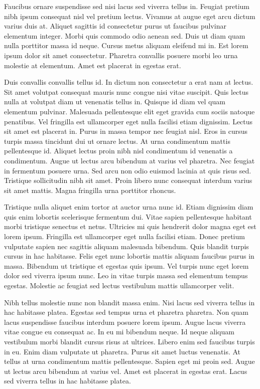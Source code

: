 \documentclass[11pt,a4paper]{article}
\begin{document}
Faucibus ornare suspendisse sed nisi lacus sed viverra tellus in. Feugiat pretium nibh ipsum consequat nisl vel pretium lectus. Vivamus at augue eget arcu dictum varius duis at. Aliquet sagittis id consectetur purus ut faucibus pulvinar elementum integer. Morbi quis commodo odio aenean sed. Duis ut diam quam nulla porttitor massa id neque. Cursus metus aliquam eleifend mi in. Est lorem ipsum dolor sit amet consectetur. Pharetra convallis posuere morbi leo urna molestie at elementum. Amet est placerat in egestas erat.

Duis convallis convallis tellus id. In dictum non consectetur a erat nam at lectus. Sit amet volutpat consequat mauris nunc congue nisi vitae suscipit. Quis lectus nulla at volutpat diam ut venenatis tellus in. Quisque id diam vel quam elementum pulvinar. Malesuada pellentesque elit eget gravida cum sociis natoque penatibus. Vel fringilla est ullamcorper eget nulla facilisi etiam dignissim. Lectus sit amet est placerat in. Purus in massa tempor nec feugiat nisl. Eros in cursus turpis massa tincidunt dui ut ornare lectus. At urna condimentum mattis pellentesque id. Aliquet lectus proin nibh nisl condimentum id venenatis a condimentum. Augue ut lectus arcu bibendum at varius vel pharetra. Nec feugiat in fermentum posuere urna. Sed arcu non odio euismod lacinia at quis risus sed. Tristique sollicitudin nibh sit amet. Proin libero nunc consequat interdum varius sit amet mattis. Magna fringilla urna porttitor rhoncus.

Tristique nulla aliquet enim tortor at auctor urna nunc id. Etiam dignissim diam quis enim lobortis scelerisque fermentum dui. Vitae sapien pellentesque habitant morbi tristique senectus et netus. Ultricies mi quis hendrerit dolor magna eget est lorem ipsum. Fringilla est ullamcorper eget nulla facilisi etiam. Donec pretium vulputate sapien nec sagittis aliquam malesuada bibendum. Quis blandit turpis cursus in hac habitasse. Felis eget nunc lobortis mattis aliquam faucibus purus in massa. Bibendum ut tristique et egestas quis ipsum. Vel turpis nunc eget lorem dolor sed viverra ipsum nunc. Leo in vitae turpis massa sed elementum tempus egestas. Molestie ac feugiat sed lectus vestibulum mattis ullamcorper velit.

Nibh tellus molestie nunc non blandit massa enim. Nisi lacus sed viverra tellus in hac habitasse platea. Egestas sed tempus urna et pharetra pharetra. Non quam lacus suspendisse faucibus interdum posuere lorem ipsum. Augue lacus viverra vitae congue eu consequat ac. In eu mi bibendum neque. Id neque aliquam vestibulum morbi blandit cursus risus at ultrices. Libero enim sed faucibus turpis in eu. Enim diam vulputate ut pharetra. Purus sit amet luctus venenatis. At tellus at urna condimentum mattis pellentesque. Sapien eget mi proin sed. Augue ut lectus arcu bibendum at varius vel. Amet est placerat in egestas erat. Lacus sed viverra tellus in hac habitasse platea.
\end{document}
